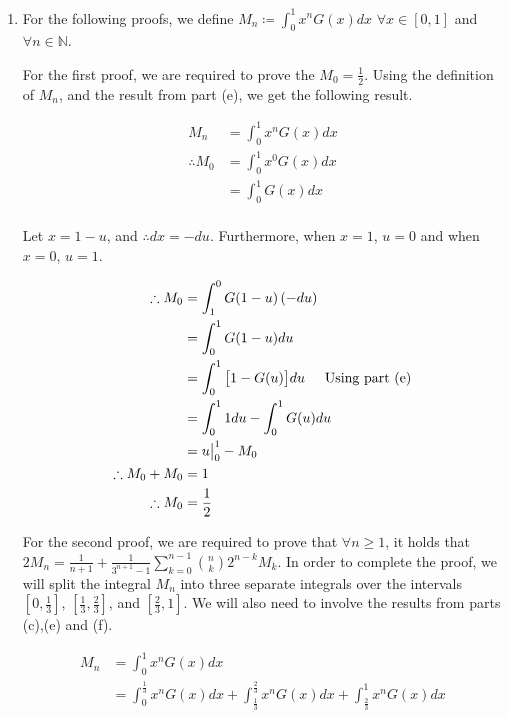 \documentclass[a4paper]{article}
\begin{document}
\begin{enumerate}[label=\textbf{\arabic*.}]
\begin{enumerate}
		\pagebreak

		\item For the following proofs, we define $M_n \coloneqq \displaystyle{\int_{0}^{1}x^{n}G(x)dx}$ \hspace{3mm} $\forall x \in [0,1]$ and $\forall n \in \mathbb{N}$. 

		\bigbreak

		For the first proof, we are required to prove the $\displaystyle{M_0 = \frac{1}{2}}$. Using the definition of $M_n$, and the result from part (e), we get the following result.

		\begin{align*}
		M_n & = \int_{0}^{1}x^{n}G(x)dx\\
		\therefore M_0 & = \int_{0}^{1}x^{0}G(x)dx\\
		& = \int_{0}^{1}G(x)dx\\
		\end{align*}

		Let $x = 1 - u$, and $\therefore dx = -du$. Furthermore, when $x = 1$, $u = 0$ and when $x = 0$, $u = 1$.

		\begin{align*}
		\therefore M_0 & = \int_{1}^{0}G(1-u)\left(-du\right)\\
		& = \int_{0}^{1}G(1-u)du\\
		& = \int_{0}^{1}\big[1 - G(u)\big]du \hspace{5mm} \text{Using part (e)}\\
		& = \int_{0}^{1}1du - \int_{0}^{1}G(u)du\\
		& = u\big{|}_{0}^{1} - M_0\\
		\therefore M_0 + M_0 & = 1\\
		\therefore M_0 & = \frac{1}{2}\\
		\end{align*}

		For the second proof, we are required to prove that $\forall n \geq 1$, it holds that \linebreak $2M_n = \displaystyle{\frac{1}{n+1} + \frac{1}{3^{n+1}-1}\sum_{k=0}^{n-1}\binom{n}{k}2^{n-k}M_k}$. In order to complete the proof, we will split the integral $M_n$ into three separate integrals over the intervals $\left[0,\frac{1}{3}\right]$, $\left[\frac{1}{3},\frac{2}{3}\right]$, and $\left[\frac{2}{3},1\right]$. We will also need to involve the results from parts (c),(e) and (f).

		\begin{align*}
		M_n & = \int_{0}^{1}x^{n}G(x)dx\\
		& = \int_{0}^{\frac{1}{3}}x^{n}G(x)dx + \int_{\frac{1}{3}}^{\frac{2}{3}}x^{n}G(x)dx + \int_{\frac{2}{3}}^{1}x^{n}G(x)dx\\
		\end{align*}


\end{enumerate}
\end{enumerate}
\end{document}
